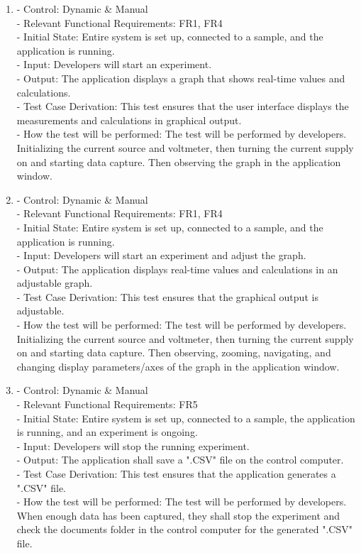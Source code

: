 \documentclass[12pt, titlepage]{article}
\begin{document}
\begin{enumerate}[{FR-T}1.]
    \item\label{T9} - Control: Dynamic \& Manual\\ 
    - Relevant Functional Requirements: FR1, FR4\\
    - Initial State: Entire system is set up, connected to a sample, and the application is running.\\
    - Input: Developers will start an experiment.\\
    - Output: The application displays a graph that shows real-time values and calculations.\\
    - Test Case Derivation: This test ensures that the user interface displays the measurements and calculations in graphical output.\\
    - How the test will be performed: The test will be performed by developers. Initializing the current source and voltmeter, then turning the current supply on and starting data capture. Then observing the graph in the application window.

    \item\label{T10} - Control: Dynamic \& Manual\\ 
    - Relevant Functional Requirements: FR1, FR4\\
    - Initial State: Entire system is set up, connected to a sample, and the application is running.\\
    - Input: Developers will start an experiment and adjust the graph.\\
    - Output: The application displays real-time values and calculations in an adjustable graph.\\
    - Test Case Derivation: This test ensures that the graphical output is adjustable.\\
    - How the test will be performed: The test will be performed by developers. Initializing the current source and voltmeter, then turning the current supply on and starting data capture. Then observing, zooming, navigating, and changing display parameters/axes of the graph in the application window.

    \item\label{T11} - Control: Dynamic \& Manual\\ 
    - Relevant Functional Requirements: FR5\\
    - Initial State: Entire system is set up, connected to a sample, the application is running, and an experiment is ongoing.\\
    - Input: Developers will stop the running experiment.\\
    - Output: The application shall save a ".CSV" file on the control computer.\\
    - Test Case Derivation: This test ensures that the application generates a ".CSV" file.\\
    - How the test will be performed: The test will be performed by developers. When enough data has been captured, they shall stop the experiment and check the documents folder in the control computer for the generated ".CSV" file.


\end{enumerate}
\end{document}

